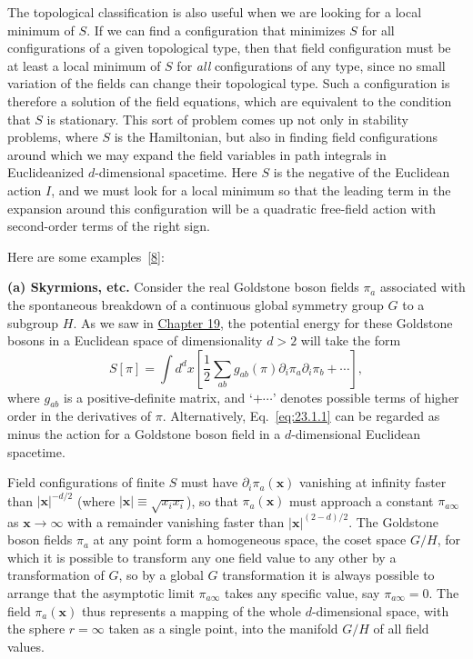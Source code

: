 The topological classification is also useful when we are looking for a
local minimum of $S$. If we can find a configuration that minimizes $S$ for
all configurations of a given topological type, then that field
configuration must be at least a local minimum of $S$ for \emph{all}
configurations of any type, since no small variation of the fields can
change their topological type. Such a configuration is therefore a solution
of the field equations, which are equivalent to the condition that $S$ is
stationary. This sort of problem comes up not only in stability problems,
where $S$ is the Hamiltonian, but also in finding field configurations
around which we may expand the field variables in path integrals in
Euclideanized $d$-dimensional spacetime. Here $S$ is the negative of the
Euclidean action $I$, and we must look for a local minimum so that the
leading term in the expansion around this configuration will be a quadratic
free-field action with second-order terms of the right sign.

Here are some examples~\hyperref[ch23-ref-8]{[8]}:

\noindent\textbf{(a) Skyrmions, etc.} Consider the real Goldstone boson
fields $\pi_a$ associated with the spontaneous breakdown of a continuous
global symmetry group $G$ to a subgroup $H$. As we saw in
\hyperref[sec:19.4]{Chapter 19}, the potential energy for these Goldstone
bosons in a Euclidean space of dimensionality $d>2$ will take the form
\begin{equation}
 S[\pi]=\int d^d x\left[
  \frac{1}{2}\sum_{ab}g_{ab}(\pi)
  \partial_i\pi_a\partial_i\pi_b+\cdots
 \right],
 \tag{23.1.1}\label{eq:23.1.1}
\end{equation}
where $g_{ab}$ is a positive-definite matrix, and `$+\cdots$' denotes
possible terms of higher order in the derivatives of $\pi$. Alternatively,
Eq.~\eqref{eq:23.1.1} can be regarded as minus the action for a Goldstone
boson field in a $d$-dimensional Euclidean spacetime.

Field configurations of finite $S$ must have
$\partial_i\pi_a(\mathbf{x})$ vanishing at infinity faster than
$|\mathbf{x}|^{-d/2}$ (where $|\mathbf{x}|\equiv\sqrt{x_ix_i}$), so that
$\pi_a(\mathbf{x})$ must approach a constant $\pi_{a\infty}$ as
$\mathbf{x}\to\infty$ with a remainder vanishing faster than
$|\mathbf{x}|^{(2-d)/2}$. The Goldstone boson fields $\pi_a$ at any point
form a homogeneous space, the coset space $G/H$, for which it is possible
to transform any one field value to any other by a transformation of $G$,
so by a global $G$ transformation it is always possible to arrange that the
asymptotic limit $\pi_{a\infty}$ takes any specific value, say
$\pi_{a\infty}=0$. The field $\pi_a(\mathbf{x})$ thus represents a mapping
of the whole $d$-dimensional space, with the sphere $r=\infty$ taken as a
single point, into the manifold $G/H$ of all field values.

